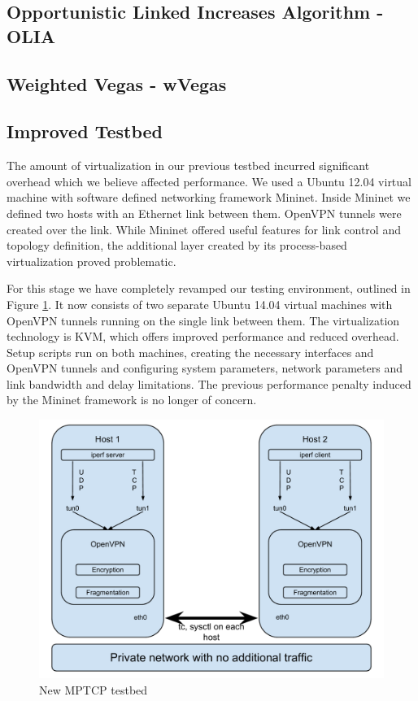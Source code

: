 \subsection{Opportunistic Linked Increases Algorithm - OLIA}
\subsection{Weighted Vegas - wVegas}
\subsection{Improved Testbed}
The amount of virtualization in our previous testbed incurred significant overhead which we believe affected performance. We used a Ubuntu 12.04 virtual machine with software defined networking framework Mininet. Inside Mininet we defined two hosts with an Ethernet link between them. OpenVPN tunnels were created over the link. While Mininet offered useful features for link control and topology definition, the additional layer created by its process-based virtualization proved problematic.

For this stage we have completely revamped our testing environment, outlined
in Figure \ref{fig:testbed}. It now
consists of two separate Ubuntu 14.04 virtual machines with OpenVPN tunnels
running on the single link between them. The virtualization technology is KVM,
which offers improved performance and reduced overhead. Setup scripts run on
both machines, creating the necessary interfaces and OpenVPN tunnels and
configuring system parameters, network parameters and link bandwidth and delay
limitations. The previous performance penalty induced by the Mininet
framework is no longer of concern.

\begin{figure}[h]
  \centering
  \includegraphics[width=\textwidth]{img/mptcp-openvpn-bare}
  \caption{New MPTCP testbed}
  \label{fig:testbed}
\end{figure}

